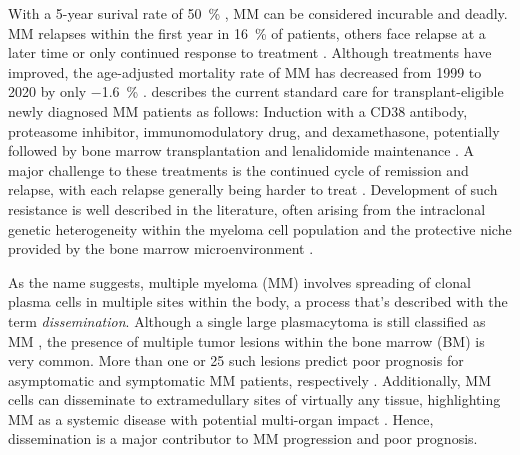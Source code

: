 With a 5-year surival rate of \SI{50}{\percent}
\cite{turessonRapidlyChangingMyeloma2018}, MM can be considered incurable and
deadly. MM relapses within the first year in \SI{16}{\percent} of patients,
others face relapse at a later time or only continued response to treatment
\cite{majithiaEarlyRelapseFollowing2016}. Although treatments have improved, the
age-adjusted mortality rate of MM has decreased from 1999 to 2020 by only
\SI{-1.6}{\percent} \cite{doddiDisparitiesMultipleMyeloma2024}.
\citet{engelhardtFunctionalCureLongterm2024} describes the current standard care
for transplant-eligible newly diagnosed MM patients as follows: Induction with a
CD38 antibody, proteasome inhibitor, immunomodulatory drug, and dexamethasone,
potentially followed by bone marrow transplantation and lenalidomide maintenance
\cite{rajkumarMultipleMyelomaCurrent2020}. A major challenge to these treatments
is the continued cycle of remission and relapse, with each relapse generally
being harder to treat \cite{podarRelapsedRefractoryMultiple2021}. Development of
such resistance is well described in the literature, often arising from the
intraclonal genetic heterogeneity within the myeloma cell population and the
protective niche provided by the bone marrow microenvironment
\cite{solimandoDrugResistanceMultiple2022}.



%
\label{sec:intro_myeloma_dissemination}%
As the name suggests, multiple myeloma (MM) involves spreading of clonal plasma
cells in multiple sites within the body, a process that's described with the
term \emph{dissemination}. Although a single large plasmacytoma is still
classified as MM \cite{rajkumarInternationalMyelomaWorking2014}, the presence of
multiple tumor lesions within the bone marrow (BM) is very common. More than one
or 25 such lesions predict poor prognosis for asymptomatic and symptomatic MM
patients, respectively \cite{kastritisPrognosticImportancePresence2014,
    maiMagneticResonanceImagingbased2015a}. Additionally, MM cells can disseminate
to extramedullary sites of virtually any tissue, highlighting MM as a systemic
disease with potential multi-organ impact
\cite{rajkumarMultipleMyelomaCurrent2020,
    bladeExtramedullaryDiseaseMultiple2022}. Hence, dissemination is a major
contributor to MM progression and poor prognosis.

